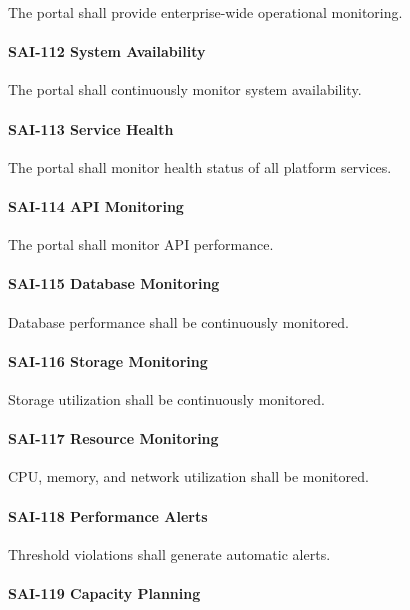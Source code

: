 The portal shall provide enterprise-wide operational monitoring.

\paragraph{SAI-112 System Availability}

The portal shall continuously monitor system availability.

\paragraph{SAI-113 Service Health}

The portal shall monitor health status of all platform services.

\paragraph{SAI-114 API Monitoring}

The portal shall monitor API performance.

\paragraph{SAI-115 Database Monitoring}

Database performance shall be continuously monitored.

\paragraph{SAI-116 Storage Monitoring}

Storage utilization shall be continuously monitored.

\paragraph{SAI-117 Resource Monitoring}

CPU, memory, and network utilization shall be monitored.

\paragraph{SAI-118 Performance Alerts}

Threshold violations shall generate automatic alerts.

\paragraph{SAI-119 Capacity Planning}

